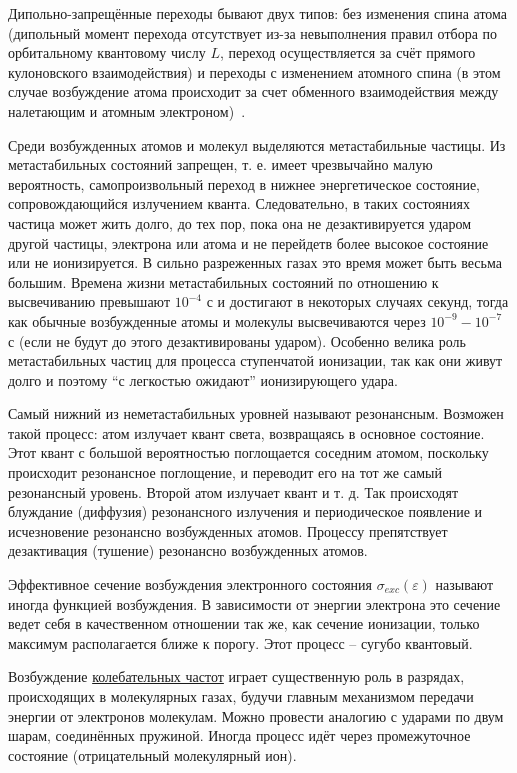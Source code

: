 \documentclass[10pt, a4paper]{article}
\numberwithin{equation}{section}
\begin{document}
Дипольно-запрещённые переходы бывают двух типов: без изменения спина атома (дипольный момент перехода отсутствует из-за невыполнения правил отбора по орбитальному квантовому числу $L$, переход осуществляется за счёт прямого кулоновского взаимодействия) и переходы с изменением атомного спина (в этом случае возбуждение атома происходит за счет обменного взаимодействия между налетающим и атомным электроном)~\cite{astap}.

Среди возбужденных атомов и молекул выделяются метастабильные частицы. Из метастабильных состояний запрещен, т. е. имеет чрезвычайно малую вероятность, самопроизвольный переход в нижнее энергетическое состояние, сопровождающийся излучением кванта. Следовательно, в таких состояниях частица может жить долго, до тех пор, пока она не дезактивируется ударом другой частицы, электрона или атома и не перейдетв более высокое состояние или не ионизируется. В сильно разреженных газах это время может быть весьма большим. Времена жизни метастабильных состояний по отношению к высвечиванию превышают $10^{-4}$ с и достигают в некоторых случаях секунд, тогда как обычные возбужденные атомы и молекулы высвечиваются через $10^{-9}-10^{-7}$ с (если не будут до этого дезактивированы ударом). Особенно велика роль метастабильных частиц для процесса ступенчатой ионизации, так как они живут долго и поэтому ``с легкостью ожидают'' ионизирующего удара.

Самый нижний из неметастабильных уровней называют резонансным. Возможен такой процесс: атом излучает квант света, возвращаясь в основное состояние. Этот квант с большой вероятностью поглощается соседним атомом, поскольку происходит резонансное поглощение, и переводит его на тот же самый резонансный уровень. Второй атом излучает квант и т. д. Так происходят блуждание (диффузия) резонансного излучения и периодическое появление и исчезновение резонансно возбужденных атомов. Процессу препятствует дезактивация (тушение) резонансно возбужденных атомов.

Эффективное сечение возбуждения электронного состояния $\sigma_{exc}(\varepsilon)$ называют иногда функцией возбуждения. В зависимости от энергии электрона это сечение ведет себя в качественном отношении так же, как сечение ионизации, только максимум располагается ближе к порогу. Этот процесс -- сугубо квантовый.

Возбуждение \uline{колебательных частот} играет существенную роль в разрядах, происходящих в молекулярных газах, будучи главным механизмом передачи энергии от электронов молекулам. Можно провести аналогию с ударами по двум шарам, соединённых пружиной. Иногда процесс идёт через промежуточное состояние (отрицательный молекулярный ион).
\end{document}
